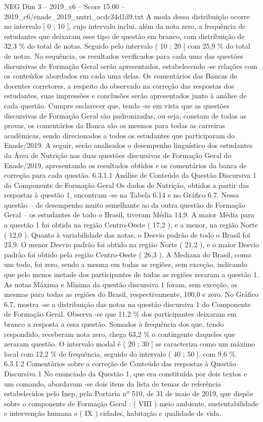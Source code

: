 \begin{textsample}{NEG Dim 3 – 2019\_c6 – Score 15.00 – 2019\_c6/enade\_2019\_nutri\_acdc34d1d9.txt}
A moda dessa distribuição ocorre no intervalo [ 0 ; 10 ], cujo intervalo inclui, além da nota zero, a frequência de estudantes que deixaram esse tipo de questão em branco, com distribuição de 32,3 \% do total de notas.
Seguido pelo intervalo ( 10 ; 20 ] com 25,9 \% do total de notas.
Na sequência, os resultados verificados para cada uma das questões discursivas de Formação Geral serão apresentados, estabelecendo -se relações com os conteúdos abordados em cada uma delas.
Os comentários das Bancas de docentes corretores, a respeito do observado na correção das respostas dos estudantes, suas impressões e conclusões serão apresentados junto à análise de cada questão.
Cumpre esclarecer que, tendo -se em vista que as questões discursivas de Formação Geral são padronizadas, ou seja, constam de todas as provas, os comentários da Banca são os mesmos para todas as carreiras acadêmicas, sendo direcionados a todos os estudantes que participaram do Enade/2019.
A seguir, serão analisados o desempenho linguístico dos estudantes da Área de Nutrição nas duas questões discursivas de Formação Geral do Enade/2019, apresentando os resultados obtidos e os comentários da banca de correção para cada questão. 6.3.1.1 Análise de Conteúdo da Questão Discursiva 1 do Componente de Formação Geral Os dados de Nutrição, obtidos a partir das respostas à questão 1, encontram -se na Tabela 6.14 e no Gráfico 6.7.
Nessa questão – de desempenho muito semelhante ao da outra questão de Formação Geral – os estudantes de todo o Brasil, tiveram Média 14,9.
A maior Média para a questão 1 foi obtida na região Centro-Oeste ( 17,2 ), e a menor, na região Norte ( 12,0 ).
Quanto à variabilidade das notas, o Desvio padrão de todo o Brasil foi 23,9.
O menor Desvio padrão foi obtido na região Norte ( 21,2 ), e o maior Desvio padrão foi obtido pela região Centro-Oeste ( 26,3 ).
A Mediana do Brasil, como um todo, foi zero, sendo a mesma em todas as regiões, sem exceção, indicando que pelo menos metade dos participantes de todas as regiões zeraram a questão 1.
As notas Máxima e Mínima da questão discursiva 1 foram, sem exceção, as mesmas para todas as regiões do Brasil, respectivamente, 100,0 e zero.
No Gráfico 6.7, mostra -se a distribuição das notas na questão discursiva 1 do Componente de Formação Geral.
Observa -se que 11,2 \% dos participantes deixaram em branco a resposta a essa questão.
Somados à frequência dos que, tendo respondido, receberam nota zero, chega 63,2 \% o contingente daqueles que zeraram questão.
O intervalo modal é ( 20 ; 30 ] se caracteriza como um máximo local com 12,2 \% de frequência, seguido do intervalo ( 40 ; 50 ], com 9,6 \%. 6.3.1.2 Comentários sobre a correção de Conteúdo das respostas à Questão Discursiva 1 No enunciado da Questão 1, que era constituída por dois textos e um comando, abordavam -se dois itens da lista de temas de referência estabelecidos pelo Inep, pela Portaria nº 510, de 31 de maio de 2019, que dispõe sobre o componente de Formação Geral : ( VIII ) meio ambiente, sustentabilidade e intervenção humana e ( IX ) cidades, habitação e qualidade de vida.

\end{textsample}
